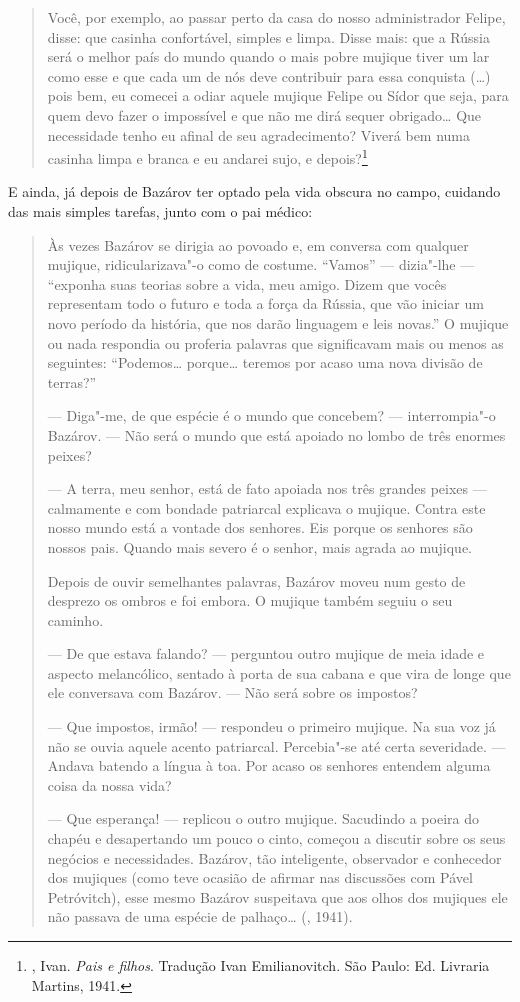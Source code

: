 \begin{quotation}
Você, por exemplo, ao passar perto da casa do nosso administrador
Felipe, disse: que casinha confortável, simples e limpa. Disse mais: que
a Rússia será o melhor país do mundo quando o mais pobre mujique tiver
um lar como esse e que cada um de nós deve contribuir para essa
conquista (\ldots{}) pois bem, eu comecei a odiar aquele mujique Felipe ou
Sídor que seja, para quem devo fazer o impossível e que não me dirá
sequer obrigado\ldots{} Que necessidade tenho eu afinal de seu
agradecimento? Viverá bem numa casinha limpa e branca e eu andarei sujo,
e depois?\footnote{, Ivan. \emph{Pais e filhos}. Tradução Ivan Emilianovitch. São Paulo: Ed. Livraria Martins, 1941.} 
\end{quotation}

E ainda, já depois de Bazárov ter optado pela vida obscura no campo, cuidando das mais simples tarefas, junto com o pai médico:

\begin{quotation}
Às vezes Bazárov se dirigia ao povoado e, em conversa com qualquer mujique, ridicularizava"-o como de costume. ``Vamos'' --- dizia"-lhe --- ``exponha suas teorias sobre a vida, meu amigo. Dizem que vocês representam todo o futuro e toda a força da Rússia, que vão iniciar um novo período da história, que nos darão linguagem e leis novas.'' O mujique ou nada respondia ou proferia palavras que significavam mais ou menos as seguintes: ``Podemos\ldots{} porque\ldots{} teremos por acaso uma nova divisão
de terras?''

--- Diga"-me, de que espécie é o mundo que concebem? ---
interrompia"-o Bazárov. --- Não será o mundo que está apoiado no
lombo de três enormes peixes?

--- A terra, meu senhor, está de fato apoiada nos três grandes peixes --- calmamente e com bondade patriarcal explicava o mujique. Contra este nosso mundo está a vontade dos senhores. Eis porque os senhores são nossos pais. Quando mais severo é o senhor, mais agrada ao mujique.

Depois de ouvir semelhantes palavras, Bazárov moveu num gesto de
desprezo os ombros e foi embora. O mujique também seguiu o seu caminho.

--- De que estava falando? --- perguntou outro mujique de meia idade e
aspecto melancólico, sentado à porta de sua cabana e que vira de longe
que ele conversava com Bazárov. --- Não será sobre os impostos?

--- Que impostos, irmão! --- respondeu o primeiro mujique. Na sua voz já não se ouvia aquele acento patriarcal. Percebia"-se até certa severidade. --- Andava batendo a língua à toa. Por acaso os senhores entendem alguma coisa da nossa vida?

--- Que esperança! --- replicou o outro mujique. Sacudindo a poeira do chapéu e desapertando um pouco o cinto, começou a discutir sobre os seus negócios e necessidades. Bazárov, tão inteligente, observador e conhecedor dos mujiques (como teve ocasião de afirmar nas discussões com Pável Petróvitch), esse mesmo Bazárov suspeitava que aos olhos dos mujiques ele não passava de uma espécie de palhaço\ldots{} (, 1941).
\end{quotation}

